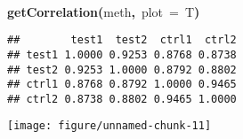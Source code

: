 \documentclass{article}
\makeatletter
\newcommand{\hlfunctioncall}[1]{\textcolor[rgb]{.5,0,.33}{\textbf{#1}}}%
\newcommand{\hlkeyword}[1]{\textbf{#1}}%
\newcommand{\hlargument}[1]{\textcolor[rgb]{.69,.25,.02}{#1}}%
\newcommand{\hlsymbol}[1]{#1}%
\newcommand{\hlstd}[1]{\textcolor[rgb]{0,0,0}{#1}}%
\newenvironment{kframe}{%
 \def\FrameCommand##1{\hskip\@totalleftmargin \hskip-\fboxsep
 \colorbox{shadecolor}{##1}\hskip-\fboxsep
     \hskip-\linewidth \hskip-\@totalleftmargin \hskip\columnwidth}%
 \MakeFramed {\advance\hsize-\width
   \@totalleftmargin\z@ \linewidth\hsize
   \@setminipage}}%
 {\par\unskip\endMakeFramed}
\newenvironment{knitrout}{}{} %
\makeatother
\begin{document}
\begin{center}
\begin{knitrout}
\color{fgcolor}\begin{kframe}
\begin{flushleft}
\ttfamily\noindent
\hspace*{\fill}\\
\hlstd{}\hlfunctioncall{getCorrelation}\hlkeyword{(}\hlsymbol{meth}\hlkeyword{,}{\ }\hlargument{plot}{\ }\hlargument{=}{\ }\hlsymbol{T}\hlkeyword{)}\mbox{}
\normalfont
\end{flushleft}
\begin{verbatim}
##        test1  test2  ctrl1  ctrl2
## test1 1.0000 0.9253 0.8768 0.8738
## test2 0.9253 1.0000 0.8792 0.8802
## ctrl1 0.8768 0.8792 1.0000 0.9465
## ctrl2 0.8738 0.8802 0.9465 1.0000
\end{verbatim}
\end{kframe}

{\centering \texttt{[image: figure/unnamed-chunk-11]} 

}


\end{knitrout}

\end{center}
\end{document}
